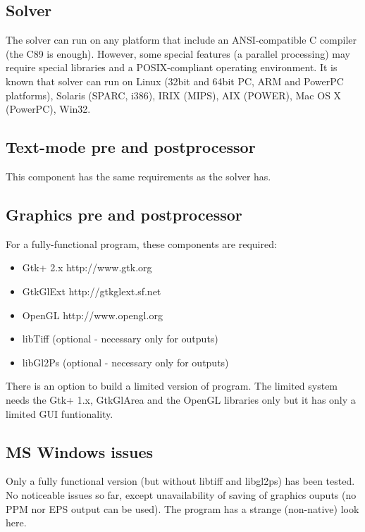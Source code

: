 \documentclass{article}
\begin{document}
\subsection{Solver}

 The solver can run on any platform that include an ANSI-compatible
 C compiler (the C89 is enough). However, some special features
 (a parallel processing) may require special libraries and 
 a POSIX-compliant operating environment. It is known that
 solver can run on Linux (32bit and 64bit PC, ARM and PowerPC
 platforms), Solaris (SPARC, i386), IRIX (MIPS), AIX (POWER),
 Mac OS X (PowerPC), Win32.



\subsection{Text-mode pre and postprocessor}

 This component has the same requirements as the solver has.



\subsection{Graphics pre and postprocessor}

 For a fully-functional program, these components are required:


\begin{itemize}
\item  Gtk+ 2.x  http://www.gtk.org
\item  GtkGlExt http://gtkglext.sf.net
\item  OpenGL http://www.opengl.org
\item  libTiff (optional - necessary only for outputs)
\item  libGl2Ps (optional - necessary only for outputs)
\end{itemize}

 There is an option to build a limited version of program.
 The limited system needs the Gtk+ 1.x, GtkGlArea and the OpenGL
 libraries only but it has only a limited GUI funtionality. 	



\subsection{MS Windows issues}

 Only a fully functional version (but without libtiff and
 libgl2ps) has been tested. No noticeable issues so far, except
 unavailability of saving of graphics ouputs (no PPM nor EPS
 output can be used).
 The program has a strange (non-native) look here.
\end{document}
